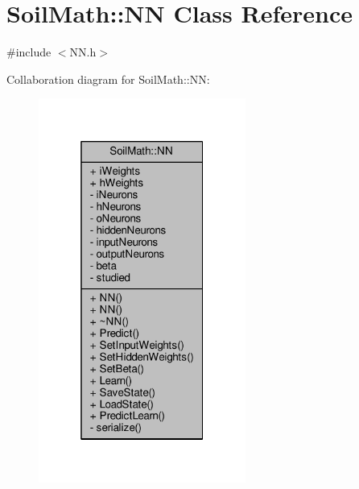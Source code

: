 \hypertarget{class_soil_math_1_1_n_n}{}\section{Soil\+Math\+:\+:N\+N Class Reference}
\label{class_soil_math_1_1_n_n}


{\ttfamily \#include $<$N\+N.\+h$>$}



Collaboration diagram for Soil\+Math\+:\+:N\+N\+:\nopagebreak
\begin{figure}[H]
\begin{center}
\leavevmode
\includegraphics[width=193pt]{class_soil_math_1_1_n_n__coll__graph}
\end{center}
\end{figure}
